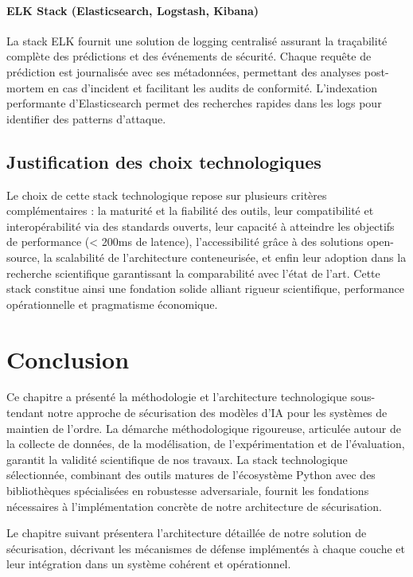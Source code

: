 \paragraph{ELK Stack (Elasticsearch, Logstash, Kibana)}
La stack ELK fournit une solution de logging centralisé assurant la traçabilité complète des prédictions et des événements de sécurité. Chaque requête de prédiction est journalisée avec ses métadonnées, permettant des analyses post-mortem en cas d'incident et facilitant les audits de conformité. L'indexation performante d'Elasticsearch permet des recherches rapides dans les logs pour identifier des patterns d'attaque.

\subsection{Justification des choix technologiques}

Le choix de cette stack technologique repose sur plusieurs critères complémentaires : la maturité et la fiabilité des outils, leur compatibilité et interopérabilité via des standards ouverts, leur capacité à atteindre les objectifs de performance (< 200ms de latence), l'accessibilité grâce à des solutions open-source, la scalabilité de l'architecture conteneurisée, et enfin leur adoption dans la recherche scientifique garantissant la comparabilité avec l'état de l'art. Cette stack constitue ainsi une fondation solide alliant rigueur scientifique, performance opérationnelle et pragmatisme économique.

\section*{Conclusion}

Ce chapitre a présenté la méthodologie et l'architecture technologique sous-tendant notre approche de sécurisation des modèles d'IA pour les systèmes de maintien de l'ordre. La démarche méthodologique rigoureuse, articulée autour de la collecte de données, de la modélisation, de l'expérimentation et de l'évaluation, garantit la validité scientifique de nos travaux. La stack technologique sélectionnée, combinant des outils matures de l'écosystème Python avec des bibliothèques spécialisées en robustesse adversariale, fournit les fondations nécessaires à l'implémentation concrète de notre architecture de sécurisation.

Le chapitre suivant présentera l'architecture détaillée de notre solution de sécurisation, décrivant les mécanismes de défense implémentés à chaque couche et leur intégration dans un système cohérent et opérationnel.